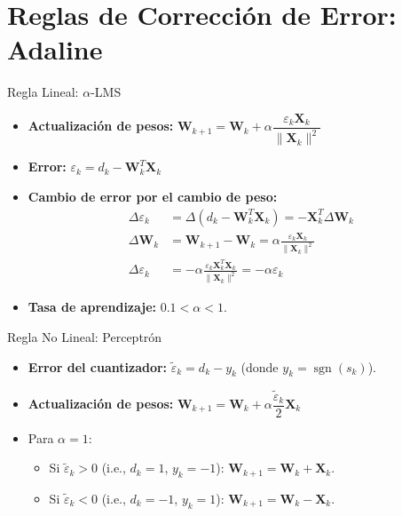 \documentclass[aspectratio=169,utf8,spanish]{beamer}
\DeclareMathOperator{\sgn}{sgn}
\begin{document}
\section{Reglas de Corrección de Error: Adaline}

\begin{frame}{Regla Lineal: $\alpha$-LMS}
  \begin{itemize}
    \item \textbf{Actualización de pesos:}
    $\mathbf{W}_{k+1} = \mathbf{W}_k + \alpha \dfrac{\varepsilon_k \mathbf{X}_k}{\|\mathbf{X}_k\|^2}$
    \item \textbf{Error:} $\varepsilon_k = d_k - \mathbf{W}_k^T \mathbf{X}_k$
    \item \textbf{Cambio de error por el cambio de peso:}
    \begin{align*}
      \Delta\varepsilon_k &= \Delta(d_k - \mathbf{W}_k^T \mathbf{X}_k) = -\mathbf{X}_k^T \Delta\mathbf{W}_k \\
      \Delta\mathbf{W}_k &= \mathbf{W}_{k+1} - \mathbf{W}_k = \alpha \frac{\varepsilon_k \mathbf{X}_k}{\|\mathbf{X}_k\|^2} \\
      \Delta\varepsilon_k &= -\alpha \frac{\varepsilon_k \mathbf{X}_k^T \mathbf{X}_k}{\|\mathbf{X}_k\|^2} = -\alpha\varepsilon_k
    \end{align*}
    \item \textbf{Tasa de aprendizaje:} $0.1 < \alpha < 1$.
  \end{itemize}
\end{frame}

\begin{frame}{Regla No Lineal: Perceptrón}
  \begin{itemize}
    \item \textbf{Error del cuantizador:} $\tilde{\varepsilon}_k = d_k - y_k$ (donde $y_k = \sgn(s_k)$).
    \item \textbf{Actualización de pesos:}
    $\mathbf{W}_{k+1} = \mathbf{W}_k + \alpha \dfrac{\tilde{\varepsilon}_k}{2} \mathbf{X}_k$
    \item Para $\alpha = 1$:
    \begin{itemize}
      \item Si $\tilde{\varepsilon}_k > 0$ (i.e., $d_k = 1$, $y_k = -1$): $\mathbf{W}_{k+1} = \mathbf{W}_k + \mathbf{X}_k$.
      \item Si $\tilde{\varepsilon}_k < 0$ (i.e., $d_k = -1$, $y_k = 1$): $\mathbf{W}_{k+1} = \mathbf{W}_k - \mathbf{X}_k$.
    \end{itemize}
  \end{itemize}
\end{frame}
\end{document}
